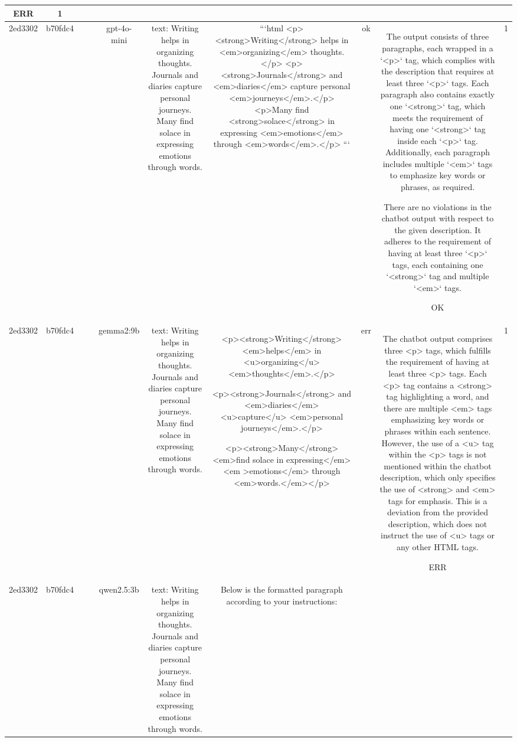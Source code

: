 \begin{table}[h!]
\begin{tabular}{|c|c|c|c|c|c|c|c|c|c|}
ERR & 1\\
\hline
2ed3302 & b70fdc4 &  &  & gpt-4o-mini & text: Writing helps in organizing thoughts. Journals and diaries capture personal journeys. Many find solace in expressing emotions through words. & ```html
<p><strong>Writing</strong> helps in <em>organizing</em> thoughts.</p>
<p><strong>Journals</strong> and <em>diaries</em> capture personal <em>journeys</em>.</p>
<p>Many find <strong>solace</strong> in expressing <em>emotions</em> through <em>words</em>.</p>
``` & ok & The output consists of three paragraphs, each wrapped in a `<p>` tag, which complies with the description that requires at least three `<p>` tags. Each paragraph also contains exactly one `<strong>` tag, which meets the requirement of having one `<strong>` tag inside each `<p>` tag. Additionally, each paragraph includes multiple `<em>` tags to emphasize key words or phrases, as required.

There are no violations in the chatbot output with respect to the given description. It adheres to the requirement of having at least three `<p>` tags, each containing one `<strong>` tag and multiple `<em>` tags. 

OK & 1\\
\hline
2ed3302 & b70fdc4 &  &  & gemma2:9b & text: Writing helps in organizing thoughts. Journals and diaries capture personal journeys. Many find solace in expressing emotions through words. & <p><strong>Writing</strong> <em>helps</em> in <u>organizing</u> <em>thoughts</em>.</p>

<p><strong>Journals</strong> and <em>diaries</em> <u>capture</u> <em>personal journeys</em>.</p>

<p><strong>Many</strong> <em>find solace in expressing</em> <em >emotions</em> through <em>words.</em></p>   
 & err & The chatbot output comprises three <p> tags, which fulfills the requirement of having at least three <p> tags. Each <p> tag contains a <strong> tag highlighting a word, and there are multiple <em> tags emphasizing key words or phrases within each sentence. However, the use of a <u> tag within the <p> tags is not mentioned within the chatbot description, which only specifies the use of <strong> and <em> tags for emphasis. This is a deviation from the provided description, which does not instruct the use of <u> tags or any other HTML tags.

ERR & 1\\
\hline
2ed3302 & b70fdc4 &  &  & qwen2.5:3b & text: Writing helps in organizing thoughts. Journals and diaries capture personal journeys. Many find solace in expressing emotions through words. & Below is the formatted paragraph according to your instructions:


\end{tabular}
\end{table}
